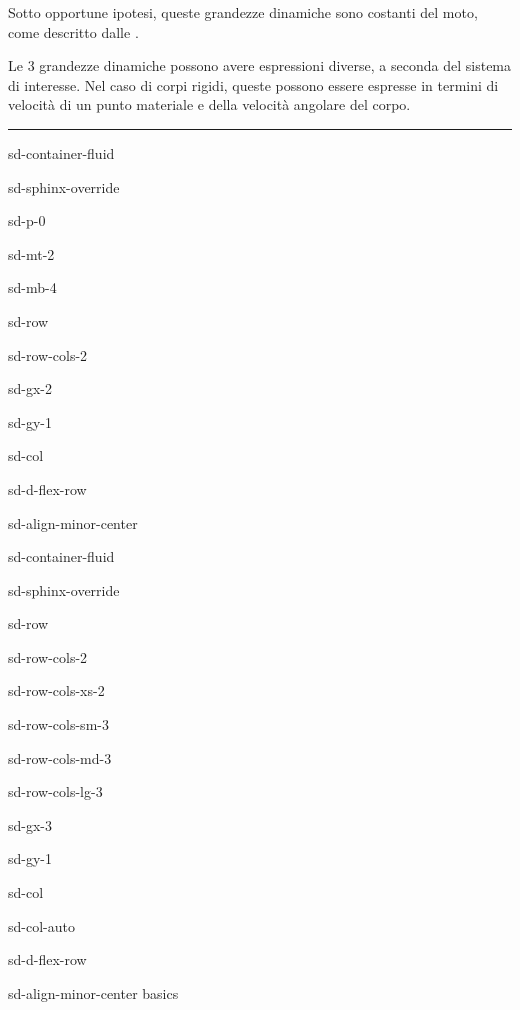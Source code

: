 \documentclass[letterpaper,10pt,italian]{jupyterBook}
\begin{document}
\sphinxAtStartPar
Sotto opportune ipotesi, queste grandezze dinamiche sono costanti del moto, come descritto dalle {\hyperref[\detokenize{ch/mechanics/dynamics-conservation:physics-hs-mechanics-dynamics-conservation}]{}}.

\sphinxAtStartPar
Le 3 grandezze dinamiche possono avere espressioni diverse, a seconda del sistema di interesse. Nel caso di corpi rigidi, queste possono essere espresse in termini di velocità di un punto materiale e della velocità angolare del corpo.


\bigskip\hrule\bigskip


\sphinxstepscope

\begin{sphinxuseclass}{sd-container-fluid}
\begin{sphinxuseclass}{sd-sphinx-override}
\begin{sphinxuseclass}{sd-p-0}
\begin{sphinxuseclass}{sd-mt-2}
\begin{sphinxuseclass}{sd-mb-4}
\begin{sphinxuseclass}{sd-row}
\begin{sphinxuseclass}{sd-row-cols-2}
\begin{sphinxuseclass}{sd-gx-2}
\begin{sphinxuseclass}{sd-gy-1}
\begin{sphinxuseclass}{sd-col}
\begin{sphinxuseclass}{sd-d-flex-row}
\begin{sphinxuseclass}{sd-align-minor-center}
\begin{sphinxuseclass}{sd-container-fluid}
\begin{sphinxuseclass}{sd-sphinx-override}
\begin{sphinxuseclass}{sd-row}
\begin{sphinxuseclass}{sd-row-cols-2}
\begin{sphinxuseclass}{sd-row-cols-xs-2}
\begin{sphinxuseclass}{sd-row-cols-sm-3}
\begin{sphinxuseclass}{sd-row-cols-md-3}
\begin{sphinxuseclass}{sd-row-cols-lg-3}
\begin{sphinxuseclass}{sd-gx-3}
\begin{sphinxuseclass}{sd-gy-1}
\begin{sphinxuseclass}{sd-col}
\begin{sphinxuseclass}{sd-col-auto}
\begin{sphinxuseclass}{sd-d-flex-row}
\begin{sphinxuseclass}{sd-align-minor-center}
\sphinxAtStartPar
basics


\end{sphinxuseclass}
\end{sphinxuseclass}
\end{sphinxuseclass}
\end{sphinxuseclass}
\end{sphinxuseclass}
\end{sphinxuseclass}
\end{sphinxuseclass}
\end{sphinxuseclass}
\end{sphinxuseclass}
\end{sphinxuseclass}
\end{sphinxuseclass}
\end{sphinxuseclass}
\end{sphinxuseclass}
\end{sphinxuseclass}
\end{sphinxuseclass}
\end{sphinxuseclass}
\end{sphinxuseclass}
\end{sphinxuseclass}
\end{sphinxuseclass}
\end{sphinxuseclass}
\end{sphinxuseclass}
\end{sphinxuseclass}
\end{sphinxuseclass}
\end{sphinxuseclass}
\end{sphinxuseclass}
\end{sphinxuseclass}
\end{document}

